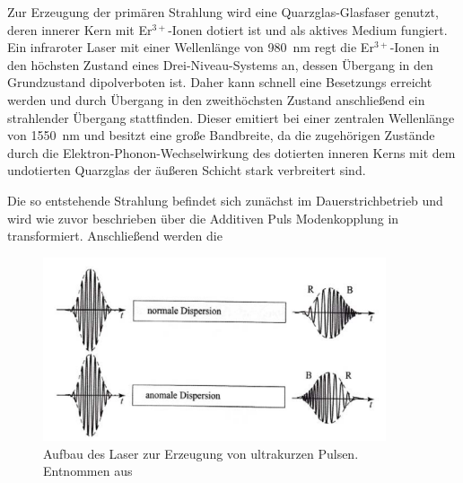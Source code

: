       Zur Erzeugung der primären Strahlung wird eine Quarzglas-Glasfaser genutzt, deren innerer Kern mit Er$^{3+}$-Ionen dotiert ist und als aktives Medium fungiert. Ein infraroter Laser mit einer Wellenlänge von 
      \SI{980}{\nano\metre} regt die Er$^{3+}$-Ionen in den höchsten Zustand eines Drei-Niveau-Systems an, dessen Übergang in den Grundzustand dipolverboten ist. Daher kann schnell eine Besetzungs erreicht 
      werden und durch Übergang in den zweithöchsten Zustand anschließend ein strahlender Übergang stattfinden. Dieser emitiert bei einer zentralen Wellenlänge von \SI{1550}{\nano\metre} und besitzt eine 
      große Bandbreite, da die zugehörigen Zustände durch die Elektron-Phonon-Wechselwirkung des dotierten inneren Kerns mit dem undotierten Quarzglas der äußeren Schicht stark verbreitert sind.
      
      Die so entstehende Strahlung befindet sich zunächst im Dauerstrichbetrieb und wird wie zuvor beschrieben über die Additiven Puls Modenkopplung in transformiert. Anschließend werden die 
  

      \FloatBarrier
      \begin{figure}[h]
        \centering
        \includegraphics[width = 0.9\textwidth]{pictures/Dispersion.png}
        \caption{Aufbau des Laser zur Erzeugung von ultrakurzen Pulsen. Entnommen aus \cite{tu_dortmund_versuchsanleitung_nodate}}
        \label{fig:Dispersion}
      \end{figure}
      \FloatBarrier
